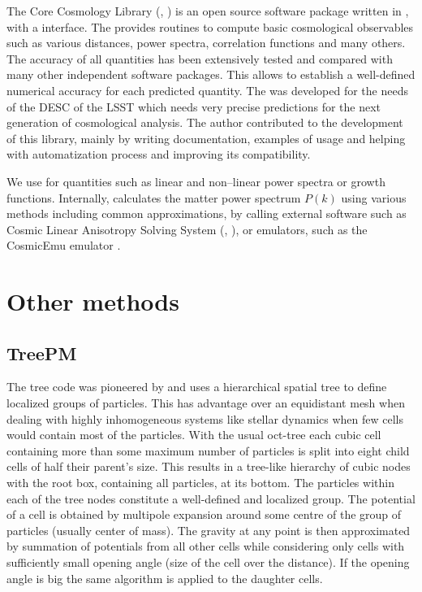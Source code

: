 The Core Cosmology Library (, \textcite{2019ApJS..242....2C}) is an open source software package written in , with a  interface. The  provides routines to compute basic cosmological observables such as various distances, power spectra, correlation functions and many others. The accuracy of all quantities has been extensively tested and compared with many other independent software packages. This allows to establish a well-defined numerical accuracy for each predicted quantity. The  was developed for the needs of the DESC of the LSST which needs very precise predictions for the next generation of cosmological analysis. The author contributed to the development of this library, mainly by writing documentation, examples of usage and helping with automatization process and improving its compatibility.

We use  for quantities such as linear and non--linear power spectra or growth functions. Internally,  calculates the matter power spectrum  $P(k)$ using various methods including common approximations, by calling external software such as Cosmic Linear Anisotropy Solving System (, \textcite{class}), or emulators, such as the CosmicEmu emulator \parencite{Heitmann:2015xma}.

\section{Other methods}
\subsection{TreePM}
The tree code was pioneered by \textcite{1986Natur.324..446B} and uses a hierarchical spatial tree to define localized groups of particles. This has advantage over an equidistant mesh when dealing with highly inhomogeneous systems like stellar dynamics when few cells would contain most of the particles. With the usual oct-tree each cubic cell containing more than some maximum number of particles is split into eight child cells of half their parent's size. This results in a tree-like hierarchy of cubic nodes with the root box, containing all particles, at its bottom. The particles within each of the tree nodes constitute a well-defined and localized group. The potential of a cell is obtained by multipole expansion around some centre of the group of particles (usually center of mass). The gravity at any point is then approximated by summation of potentials from all other cells while considering only cells with sufficiently small opening angle (size of the cell over the distance). If the opening angle is big the same algorithm is applied to the daughter cells.

